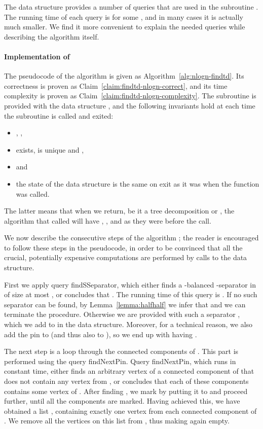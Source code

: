 \documentclass[a4paper,11pt]{article}
\theoremstyle{definition}
\theoremstyle{remark}
\newcommand{\qSsep}{\textnormal{findSSeparator}}
\newcommand{\qpin}{\textnormal{findNextPin}}
\begin{document}
The data structure provides a number of queries that are used in the
subroutine .  The running time of each query is  for some , and in many cases it is actually
much smaller.  We find it more convenient to explain the needed
queries while describing the algorithm itself.





\paragraph{Implementation of }
The pseudocode of the algorithm  is given as
Algorithm~\ref{alg:nlogn-findtd}.  Its correctness is proven as
Claim~\ref{claim:findtd-nlogn-correct}, and its time complexity is
proven as Claim~\ref{claim:findtd-nlogn-complexity}.  The subroutine
is provided with the data structure , and the following
invariants hold at each time the subroutine is called and exited:
\begin{itemize}
\item , ,
\item  exists, is unique and ,
\item  and
\item the state of the data structure is the same on exit as it was
  when the function was called.
\end{itemize}
The latter means that when we return, be it a tree decomposition or
, the algorithm that called  will have , , 
and  as they were before the call.

We now describe the consecutive steps of the algorithm ; the
reader is encouraged to follow these steps in the pseudocode, in order
to be convinced that all the crucial, potentially expensive
computations are performed by calls to the data structure.

First we apply query \qSsep, which either finds a
-balanced -separator in  of size at most
, or concludes that .  The running time of this query
is .  If no such separator can be found, by
Lemma~\ref{lemma:halfhalf} we infer that  and we
can terminate the procedure.  Otherwise we are provided with such a
separator , which we add to  in the data structure.
Moreover, for a technical reason, we also add the pin  to 
(and thus also to ), so we end up with having .

The next step is a loop through the connected components of .  This part is performed using the query
\qpin.  Query \qpin, which runs in constant time, either finds an
arbitrary vertex  of a connected component of  that does not contain any vertex from , or concludes
that each of these components contains some vertex of .  After
finding , we mark  by putting it to  and proceed further,
until all the components are marked.  Having achieved this, we have
obtained a list , containing exactly one vertex from each
connected component of .  We remove
all the vertices on this list from , thus making  again empty.
\end{document}
